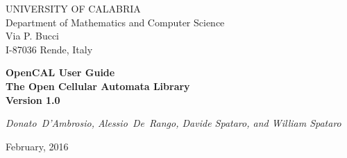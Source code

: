 \thispagestyle{empty}

\newcommand{\HS}[1][1.]{\hspace{\stretch{#1}}}
\begin{center}


\huge{UNIVERSITY OF CALABRIA}\\
\vspace*{0.25cm}
\large{Department of Mathematics and Computer Science}\\
\normalsize{Via P. Bucci\\
I-87036 Rende, Italy\\
\vspace*{0.25cm} \HS \hrulefill \HS}



\vspace*{3.5cm}

\Huge{\textbf{OpenCAL User Guide}}\\
\vspace*{0.2cm}
\large{\textbf{The Open Cellular Automata Library}}\\
\vspace*{0.7cm}
\Large{\textbf{Version 1.0}}
\vspace*{1cm}


\vspace*{1cm}

\normalsize{\textit{Donato~D'Ambrosio, Alessio~De~Rango, Davide Spataro, and William Spataro}}

\vspace*{3.5cm}

\normalsize{February, 2016}

\vspace*{2.0cm}



\end{center}
